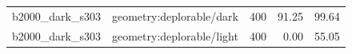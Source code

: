 \begin{longtable}{l>{\raggedright\arraybackslash}p{.42\linewidth}rrr}
b2000\_\allowbreak{}dark\_\allowbreak{}s303 & %
geometry:deplorable/dark & %
400 & %
91.25 & %
99.64 \\ %

b2000\_\allowbreak{}dark\_\allowbreak{}s303 & %
geometry:deplorable/light & %
400 & %
0.00 & %
55.05 \\ %


\end{longtable}
